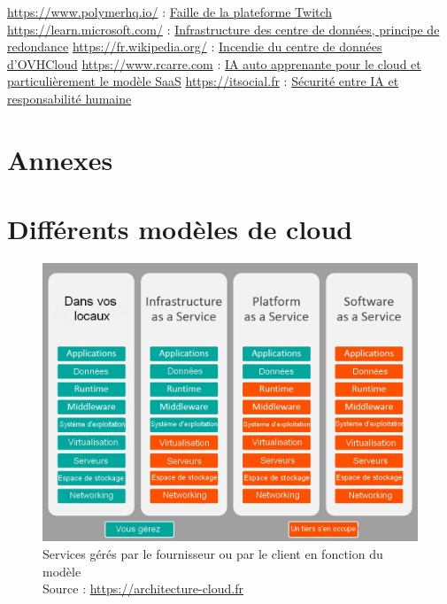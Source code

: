 \documentclass[a4paper, 12pt]{article}
\begin{document}
\begin{spacing}{1.1}
\begin{thebibliography}{3}
    \bibitem{} \url{https://www.polymerhq.io/} : \href{https://www.polymerhq.io/blog/breach/how-did-the-twitch-data-leak-happen/}{Faille de la plateforme Twitch}
    \bibitem{} \url{https://learn.microsoft.com/} : \href{https://learn.microsoft.com/fr-fr/compliance/assurance/assurance-datacenter-architecture-infrastructure}{Infrastructure des centre de données, principe  de redondance}
    \bibitem{} \url{https://fr.wikipedia.org/} : \href{https://fr.wikipedia.org/wiki/Incendie_du_centre_de_donn%C3%A9es_d%27OVHcloud_%C3%A0_Strasbourg}{Incendie du centre de données d'OVHCloud}
    \bibitem{} \url{https://www.rcarre.com} : \href{https://www.rcarre.com/blog/intelligence-artificielle-auto-apprenante-pour-le-cloud-and-saas/}{IA auto apprenante pour le cloud et particulièrement le modèle SaaS}
    \bibitem{} \url{https://itsocial.fr} : \href{https://itsocial.fr/partenaires/oracle-partenaire/tribunes-oracle/securite-du-cloud-entre-intelligence-artificielle-et-responsabilite-humaine/}{Sécurité entre IA et responsabilité humaine}
  \end{thebibliography}

  \newpage
  \section*{Annexes}
  \appendix
    \section{Différents modèles de cloud}
      \begin{figure}[h]
        \centering
        \includegraphics[scale=.4]{img/modeles.jpg}
        \caption{Services gérés par le fournisseur ou par le client en
        fonction du modèle \\ Source : \url{https://architecture-cloud.fr}}
      \end{figure}
      \label{fig:modeles}
  \end{spacing}
\end{document}
